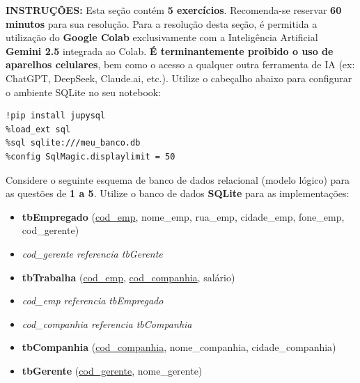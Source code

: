 \documentclass[12pt,a4paper]{article}
\begin{document}
\textbf{INSTRUÇÕES:} Esta seção contém \textbf{5 exercícios}. Recomenda-se reservar \textbf{60 minutos} para sua resolução. Para a resolução desta seção, é permitida a utilização do \textbf{Google Colab} exclusivamente com a Inteligência Artificial \textbf{Gemini 2.5} integrada ao Colab. \textbf{É terminantemente proibido o uso de aparelhos celulares}, bem como o acesso a qualquer outra ferramenta de IA (ex: ChatGPT, DeepSeek, Claude.ai, etc.). Utilize o cabeçalho abaixo para configurar o ambiente SQLite no seu notebook:

\begin{verbatim}
!pip install jupysql
%load_ext sql
%sql sqlite:///meu_banco.db
%config SqlMagic.displaylimit = 50
\end{verbatim}

\vspace{0.3cm}

Considere o seguinte esquema de banco de dados relacional (modelo lógico) para as questões de \textbf{1 a 5}. Utilize o banco de dados \textbf{SQLite} para as implementações:

\begin{itemize}[label={}]
    \item \textbf{tbEmpregado} (\underline{cod\_emp}, nome\_emp, rua\_emp, cidade\_emp, fone\_emp, cod\_gerente)
    \item \textit{cod\_gerente referencia tbGerente}
    \item \textbf{tbTrabalha} (\underline{cod\_emp}, \underline{cod\_companhia}, salário)
    \item \textit{cod\_emp referencia tbEmpregado}
    \item \textit{cod\_companhia referencia tbCompanhia}
    \item \textbf{tbCompanhia} (\underline{cod\_companhia}, nome\_companhia, cidade\_companhia)
    \item \textbf{tbGerente} (\underline{cod\_gerente}, nome\_gerente)
\end{itemize}

\vspace{0.3cm}
\end{document}
